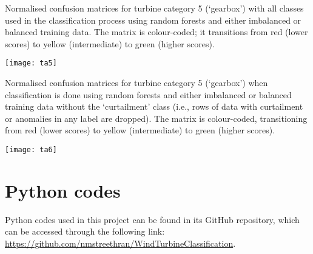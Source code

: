 \begin{table}
  \centering
  \captionsetup{labelformat=empty,list=no}
  \caption{Normalised confusion matrices for turbine category 5 (`gearbox') with all classes used in the classification process using random forests and either imbalanced or balanced training data. The matrix is colour-coded; it transitions from red (lower scores) to yellow (intermediate) to green (higher scores).}
  \texttt{[image: ta5]}
\end{table}

\begin{table}
  \centering
  \captionsetup{labelformat=empty,list=no}
  \caption{Normalised confusion matrices for turbine category 5 (`gearbox') when classification is done using random forests and either imbalanced or balanced training data without the `curtailment' class (i.e., rows of data with curtailment or anomalies in any label are dropped). The matrix is colour-coded, transitioning from red (lower scores) to yellow (intermediate) to green (higher scores).}
  \texttt{[image: ta6]}
\end{table}

\chapter{Python codes}\label{a5}

Python codes used in this project can be found in its GitHub repository, which can be accessed through the following link: \url{https://github.com/nmstreethran/WindTurbineClassification}.
